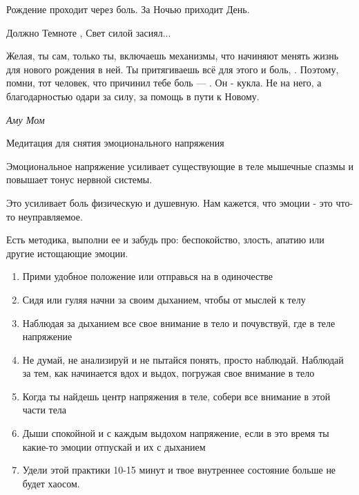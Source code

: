 Рождение проходит через боль. За Ночью приходит День.

Должно Темноте ,  Свет силой засиял...

Желая, ты сам, только ты, включаешь механизмы, что начиняют менять жизнь для нового рождения в ней. Ты притягиваешь всё для этого и боль, . Поэтому, помни, тот человек, что причинил тебе боль --- . Он - кукла. Не  на него, а благодарностью одари за силу, за помощь в пути к Новому.

\begin{flushright}
    \it Аму Мом
\end{flushright}

Медитация для снятия эмоционального напряжения

Эмоциональное напряжение усиливает существующие в теле мышечные спазмы и повышает тонус нервной системы.

Это усиливает боль физическую и душевную. Нам кажется, что эмоции - это что-то неуправляемое.

Есть методика, выполни ее и забудь про: беспокойство, злость, апатию или другие истощающие эмоции.

\begin{enumerate}
    \item Прими удобное положение или отправься на  в одиночестве

    \item Сидя или гуляя начни  за своим дыханием, чтобы  от мыслей к телу

    \item Наблюдая за дыханием  все свое внимание в тело и почувствуй, где в теле  напряжение

    \item Не думай, не анализируй и не пытайся понять, просто наблюдай.
          Наблюдай за тем, как начинается вдох и выдох, погружая свое внимание в тело

    \item Когда ты найдешь центр напряжения в теле, собери все внимание в этой части тела

    \item Дыши спокойной и с каждым выдохом  напряжение,
          если в это время ты  какие-то эмоции
          отпускай и их с дыханием

    \item Удели этой практики 10-15 минут и твое внутреннее состояние больше не будет  хаосом.
\end{enumerate}

